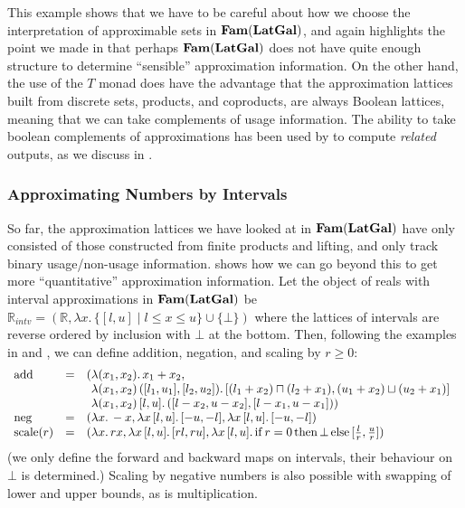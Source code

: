 This example shows that we have to be careful about how we choose the
interpretation of approximable sets in $\mathbf{Fam}(\mathbf{LatGal})$, and again
highlights the point we made in  that
perhaps $\mathbf{Fam}(\mathbf{LatGal})$ does not have quite enough structure to
determine ``sensible'' approximation information. On the other hand,
the use of the $T$ monad does have the advantage that the
approximation lattices built from discrete sets, products, and
coproducts, are always Boolean lattices, meaning that we can take
complements of usage information. The ability to take boolean
complements of approximations has been used by \citet{perera22} to
compute \emph{related} outputs, as we discuss in
.

\subsubsection{Approximating Numbers by Intervals}
\label{sec:interval-approx}

So far, the approximation lattices we have looked at in
$\mathbf{Fam}(\mathbf{LatGal})$ have only consisted of those constructed from finite
products and lifting, and only track binary usage/non-usage
information.  shows how we can go
beyond this to get more ``quantitative'' approximation
information. Let the object of reals with interval approximations in
$\mathbf{Fam}(\mathbf{LatGal})$ be
$\mathbb{R}_{\mathit{intv}} = (\mathbb{R}, \lambda x.\,\{[l,u] \mid l
\leq x \leq u\} \cup \{\bot\})$ where the lattices of intervals are
reverse ordered by inclusion with $\bot$ at the bottom. Then,
following the examples in  and
, we can define addition, negation, and
scaling by $r \geq 0$:
\begin{displaymath}
  \begin{array}{lcl}
    \mathrm{add}&=&(\begin{array}[t]{@{}l}
      \lambda (x_1,x_2).\,x_1+x_2, \\
      \lambda (x_1,x_2)\,([l_1,u_1],[l_2,u_2]).\,[(l_1+x_2) \sqcap (l_2+x_1),(u_1+x_2) \sqcup (u_2+x_1)] \\
      \lambda (x_1,x_2)\,[l,u].\,([l-x_2,u-x_2],[l-x_1,u-x_1]))
    \end{array}\\
    \mathrm{neg}&=&(\lambda x.\,-x, \lambda x\,[l,u].\,[-u,-l], \lambda x\,[l,u].\,[-u,-l]) \\
    \mathrm{scale}(r)&=&(\lambda x.\,rx, \lambda x\,[l,u].\,[rl,ru], \lambda x\,[l,u].\,\mathrm{if}\,r=0\,\mathrm{then}\,\bot\,\mathrm{else}\,[\frac{l}{r},\frac{u}{r}])
  \end{array}
\end{displaymath}
(we only define the forward and backward maps on intervals, their
behaviour on $\bot$ is determined.)  Scaling by negative numbers is
also possible with swapping of lower and upper bounds, as is
multiplication.

